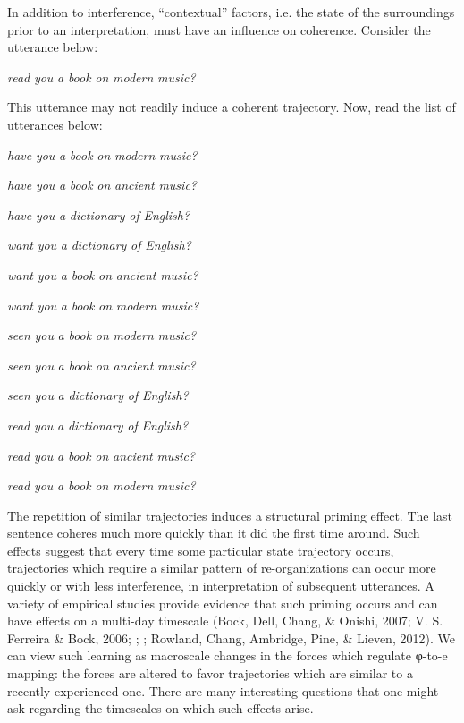   In addition to interference, “contextual” factors, i.e. the state of the surroundings prior to an interpretation, must have an influence on coherence. Consider the utterance below:

    \textit{read} \textit{you} \textit{a} \textit{book} \textit{on} \textit{modern} \textit{music?}

This utterance may not readily induce a coherent trajectory. Now, read the list of utterances below:

\textit{have} \textit{you} \textit{a} \textit{book} \textit{on} \textit{modern} \textit{music?}

\textit{have} \textit{you} \textit{a} \textit{book} \textit{on} \textit{ancient} \textit{music?}

\textit{have} \textit{you} \textit{a} \textit{dictionary} \textit{of} \textit{English?}

\textit{want} \textit{you} \textit{a} \textit{dictionary} \textit{of} \textit{English?}

\textit{want} \textit{you} \textit{a} \textit{book} \textit{on} \textit{ancient} \textit{music?}

\textit{want} \textit{you} \textit{a} \textit{book} \textit{on} \textit{modern} \textit{music?}

\textit{seen} \textit{you} \textit{a} \textit{book} \textit{on} \textit{modern} \textit{music?}

\textit{seen} \textit{you} \textit{a} \textit{book} \textit{on} \textit{ancient} \textit{music?}

\textit{seen} \textit{you} \textit{a} \textit{dictionary} \textit{of} \textit{English?}

\textit{read} \textit{you} \textit{a} \textit{dictionary} \textit{of} \textit{English?}

\textit{read} \textit{you} \textit{a} \textit{book} \textit{on} \textit{ancient} \textit{music?}

\textit{read} \textit{you} \textit{a} \textit{book} \textit{on} \textit{modern} \textit{music?}

  The repetition of similar trajectories induces a structural priming effect. The last sentence coheres much more quickly than it did the first time around. Such effects suggest that every time some particular state trajectory occurs, trajectories which require a similar pattern of re-organizations can occur more quickly or with less interference, in interpretation of subsequent utterances. A variety of empirical studies provide evidence that such priming occurs and can have effects on a multi-day timescale (Bock, Dell, Chang, \& Onishi, 2007; V. S. Ferreira \& Bock, 2006; \citealt{Nagata1988,Nagata1992}; \citealt{PickeringFerreira2008}; Rowland, Chang, Ambridge, Pine, \& Lieven, 2012). We can view such learning as macroscale changes in the forces which regulate φ-to-e mapping: the forces are altered to favor trajectories which are similar to a recently experienced one. There are many interesting questions that one might ask regarding the timescales on which such effects arise.

